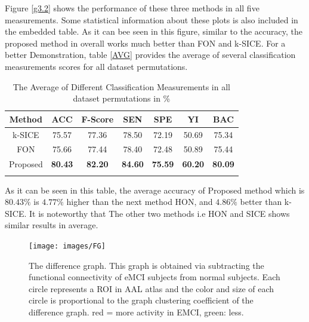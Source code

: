 \documentclass[preprint,12pt]{elsarticle}
\begin{document}
	
	Figure \eqref{g3.2} shows the performance of these three methods in all five measurements. Some statistical information about these plots is also included in the embedded table. As it can bee seen in this figure, similar to the accuracy, the proposed method in overall works much better than FON and k-SICE. For a better Demonstration, table \eqref{AVG} provides the average of several classification measurements scores for all dataset permutations. 
	\begin{table}
		\begin{center}
			\caption{The Average of Different Classification Measurements in all dataset permutations in \% }
			\begin{tabular}{@{}c*{6}{c}}
				\hline\hline
				Method&ACC& F-Score&SEN & SPE &YI & BAC 
				\\
				\hline
				k-SICE  &75.57& 77.36 & 78.50 & 72.19 & 50.69 & 75.34 
				\\
				FON   &75.66& 77.44 & 78.40 & 72.48 & 50.89 & 75.44  
				\\
				Proposed &\textbf{80.43}& \textbf{82.20} & \textbf{84.60} & \textbf{75.59} & \textbf{60.20} & \textbf{80.09}
				
				\\
				
				\hline\hline
				\label{AVG}
			\end{tabular}
		\end{center}
	\end{table}
	As it can be seen in this table, the average accuracy of Proposed method which is $80.43 \%$ is $4.77\%$ higher than the next method HON, and $4.86 \%$ better than k-SICE. It is noteworthy that The other two methods i.e HON and SICE shows similar results in average.  
	
	\begin{figure}
		\centering
		\texttt{[image: images/FG]}
		\caption{
			The difference graph. This graph is obtained via subtracting the functional connectivity of eMCI subjects from normal subjects. Each circle represents a ROI in AAL atlas and the color and size of each circle is proportional to the graph clustering coefficient of the difference graph. red = more activity in EMCI, green: less. 
		}
		\label{g3.3}
	\end{figure}
	
\end{document}
